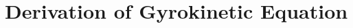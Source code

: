 
\chapter{Derivation of Gyrokinetic Equation}
\label{chap:derivationGyrokineticEq}

\thispagestyle{empty}
\newpage
